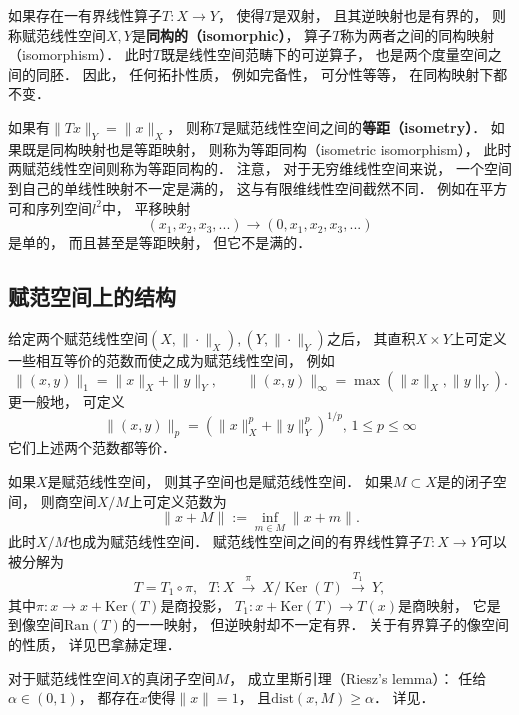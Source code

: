 如果存在一有界线性算子$T:X\to Y$， 使得$T$是双射， 且其逆映射也是有界的， 则称赋范线性空间$X,Y$是\textbf{同构的（isomorphic）}， 算子$T$称为两者之间的同构映射（isomorphism）． 此时$T$既是线性空间范畴下的可逆算子， 也是两个度量空间之间的同胚． 因此， 任何拓扑性质， 例如完备性， 可分性等等， 在同构映射下都不变． 

如果有$\|Tx\|_Y=\|x\|_X$， 则称$T$是赋范线性空间之间的\textbf{等距（isometry）}． 如果既是同构映射也是等距映射， 则称为等距同构（isometric isomorphism）， 此时两赋范线性空间则称为等距同构的． 注意， 对于无穷维线性空间来说， 一个空间到自己的单线性映射不一定是满的， 这与有限维线性空间截然不同． 例如在平方可和序列空间$l^2$中， 平移映射
$$
(x_1,x_2,x_3,...)\to(0,x_1,x_2,x_3,...)
$$
是单的， 而且甚至是等距映射， 但它不是满的．

\subsection{赋范空间上的结构}
给定两个赋范线性空间$(X,\|\cdot\|_X),(Y,\|\cdot\|_Y)$之后， 其直积$X\times Y$上可定义一些相互等价的范数而使之成为赋范线性空间， 例如
$$
\|(x,y)\|_{1}=\|x\|_X+\|y\|_Y,\qquad \|(x,y)\|_{\infty }=\max(\|x\|_X,\|y\|_Y).
$$
更一般地， 可定义
$$
\|(x,y)\|_{p}=\left(\|x\|_X^p+\|y\|_Y^p\right)^{1/p},\,1\leq p\leq\infty
$$
它们上述两个范数都等价．

如果$X$是赋范线性空间， 则其子空间也是赋范线性空间． 如果$M\subset X$是的闭子空间， 则商空间$X/M$上可定义范数为
$$
\|x+M\|:=\inf \limits _{m\in M}\|x+m\|.
$$
此时$X/M$也成为赋范线性空间． 赋范线性空间之间的有界线性算子$T:X\to Y$可以被分解为
$$
T=T_{1}\circ \pi ,\ \ \ T:X\ {\overset {\pi }{\longrightarrow }}\ X/\operatorname {Ker} (T)\ {\overset {T_{1}}{\longrightarrow }}\ Y,
$$
其中$\pi:x\to x+\text{Ker}(T)$是商投影， $T_1:x+\text{Ker}(T)\to T(x)$是商映射， 它是到像空间$\text{Ran}(T)$的一一映射， 但逆映射却不一定有界． 关于有界算子的像空间的性质， 详见巴拿赫定理． %

对于赋范线性空间$X$的真闭子空间$M$， 成立里斯引理（Riesz's lemma）： 任给$\alpha\in(0,1)$， 都存在$x$使得$\|x\|=1$， 且$\text{dist}(x,M)\geq\alpha$． 详见．
